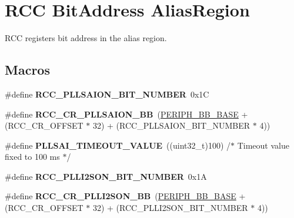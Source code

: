 \hypertarget{group___r_c_c_ex___bit_address___alias_region}{}\section{R\+CC Bit\+Address Alias\+Region}
\label{group___r_c_c_ex___bit_address___alias_region}


R\+CC registers bit address in the alias region.  


\subsection*{Macros}
\begin{DoxyCompactItemize}
\item 
\#define {\bfseries R\+C\+C\+\_\+\+P\+L\+L\+S\+A\+I\+O\+N\+\_\+\+B\+I\+T\+\_\+\+N\+U\+M\+B\+ER}~0x1C\hypertarget{group___r_c_c_ex___bit_address___alias_region_ga501d54424aaf471494be473eeccc08dd}{}\label{group___r_c_c_ex___bit_address___alias_region_ga501d54424aaf471494be473eeccc08dd}

\item 
\#define {\bfseries R\+C\+C\+\_\+\+C\+R\+\_\+\+P\+L\+L\+S\+A\+I\+O\+N\+\_\+\+BB}~(\hyperlink{group___peripheral__memory__map_gaed7efc100877000845c236ccdc9e144a}{P\+E\+R\+I\+P\+H\+\_\+\+B\+B\+\_\+\+B\+A\+SE} + (R\+C\+C\+\_\+\+C\+R\+\_\+\+O\+F\+F\+S\+ET $\ast$ 32) + (R\+C\+C\+\_\+\+P\+L\+L\+S\+A\+I\+O\+N\+\_\+\+B\+I\+T\+\_\+\+N\+U\+M\+B\+ER $\ast$ 4))\hypertarget{group___r_c_c_ex___bit_address___alias_region_ga11c2e56618cd2ae7db99eabce96f00bd}{}\label{group___r_c_c_ex___bit_address___alias_region_ga11c2e56618cd2ae7db99eabce96f00bd}

\item 
\#define {\bfseries P\+L\+L\+S\+A\+I\+\_\+\+T\+I\+M\+E\+O\+U\+T\+\_\+\+V\+A\+L\+UE}~((uint32\+\_\+t)100)  /$\ast$ Timeout value fixed to 100 ms  $\ast$/\hypertarget{group___r_c_c_ex___bit_address___alias_region_gaa798e797ccefa001aff2218b06b6e448}{}\label{group___r_c_c_ex___bit_address___alias_region_gaa798e797ccefa001aff2218b06b6e448}

\item 
\#define {\bfseries R\+C\+C\+\_\+\+P\+L\+L\+I2\+S\+O\+N\+\_\+\+B\+I\+T\+\_\+\+N\+U\+M\+B\+ER}~0x1A\hypertarget{group___r_c_c_ex___bit_address___alias_region_gae49dcc8957cc802342748396c2fd4616}{}\label{group___r_c_c_ex___bit_address___alias_region_gae49dcc8957cc802342748396c2fd4616}

\item 
\#define {\bfseries R\+C\+C\+\_\+\+C\+R\+\_\+\+P\+L\+L\+I2\+S\+O\+N\+\_\+\+BB}~(\hyperlink{group___peripheral__memory__map_gaed7efc100877000845c236ccdc9e144a}{P\+E\+R\+I\+P\+H\+\_\+\+B\+B\+\_\+\+B\+A\+SE} + (R\+C\+C\+\_\+\+C\+R\+\_\+\+O\+F\+F\+S\+ET $\ast$ 32) + (R\+C\+C\+\_\+\+P\+L\+L\+I2\+S\+O\+N\+\_\+\+B\+I\+T\+\_\+\+N\+U\+M\+B\+ER $\ast$ 4))\hypertarget{group___r_c_c_ex___bit_address___alias_region_gaba1aa8936828d49aab102dd1fcc1ce22}{}\label{group___r_c_c_ex___bit_address___alias_region_gaba1aa8936828d49aab102dd1fcc1ce22}


\end{DoxyCompactItemize}
